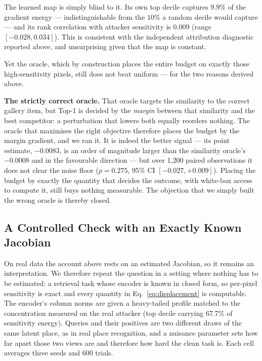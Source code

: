 \documentclass[10pt,journal]{IEEEtran}
\begin{document}
The learned map is simply blind to it. Its own top decile captures $9.9\%$ of
the gradient energy --- indistinguishable from the $10\%$ a random decile
would capture --- and its rank correlation with attacker sensitivity is
$0.009$ (range $[-0.028, 0.034]$). This is consistent with the independent
attribution diagnostic reported above, and unsurprising given that the map is
constant.

Yet the oracle, which by construction places the entire budget on exactly
those high-sensitivity pixels, still does not beat uniform --- for the two
reasons derived above.

\textbf{The strictly correct oracle.} That oracle targets the similarity to
the correct gallery item, but Top-1 is decided by the \emph{margin} between
that similarity and the best competitor: a perturbation that lowers both
equally reorders nothing. The oracle that maximises the right objective
therefore places the budget by the margin gradient, and we ran it. It is
indeed the better signal --- its point estimate, $-0.0083$, is an order of
magnitude larger than the similarity oracle's $-0.0008$ and in the favourable
direction --- but over 1,200 paired observations it does not clear the noise
floor ($p=0.275$, 95\% CI $[-0.027, +0.009]$). Placing the budget by exactly
the quantity that decides the outcome, with white-box access to compute it,
still buys nothing measurable. The objection that we simply built the wrong
oracle is thereby closed.

\subsection{A Controlled Check with an Exactly Known Jacobian}
\label{sec:known-jacobian}

On real data the account above rests on an estimated Jacobian, so it remains
an interpretation. We therefore repeat the question in a setting where nothing
has to be estimated: a retrieval task whose encoder is known in closed form,
so per-pixel sensitivity is exact and every quantity in
Eq.~\eqref{eq:displacement} is computable. The encoder's column norms are
given a heavy-tailed profile matched to the concentration measured on the real
attacker (top decile carrying $67.7\%$ of sensitivity energy). Queries and
their positives are two different draws of the same latent place, as in real
place recognition, and a nuisance parameter sets how far apart those two views
are and therefore how hard the clean task is. Each cell averages three seeds
and 600 trials.
\end{document}
